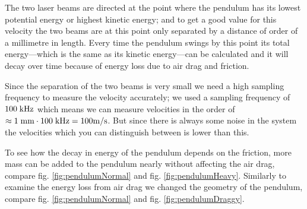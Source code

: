 The two laser beams are directed at the point where the pendulum has its lowest potential energy or highest kinetic energy; and to get a good value for this velocity the two beams are at this point only separated by a distance of order of a millimetre in length.
Every time the pendulum swings by this point its total energy---which is the same as its kinetic energy---can be calculated and it will decay over time because of energy loss due to air drag and friction.

Since the separation of the two beams is very small we need a high sampling frequency to measure the velocity accurately; we used a sampling frequency of $100\;\rm{kHz}$ which means we can measure velocities in the order of 
\mbox{$\approx 1\;\rm{mm} \cdot 100\;\rm{kHz} = 100 \rm{m/s}$}.
But since there is always some noise in the system the velocities which you can distinguish between is lower than this.

To see how the decay in energy of the pendulum depends on the friction, more mass can be added to the pendulum nearly without affecting the air drag, compare fig. \ref{fig:pendulumNormal} and fig. \ref{fig:pendulumHeavy}.
Similarly to examine the energy loss from air drag we changed the geometry of the pendulum, compare
fig. \ref{fig:pendulumNormal} and fig. \ref{fig:pendulumDraggy}.



